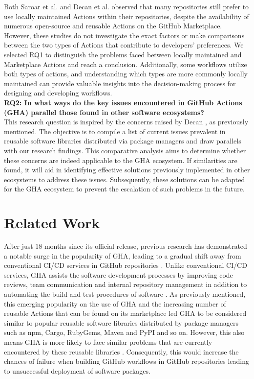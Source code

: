 \documentclass[conference]{IEEEtran}
\begin{document}
    Both Saroar et al. \cite{saroar2023developers} and Decan et al. \cite{decan2022use} observed that many repositories still prefer to use locally maintained Actions within their repositories, despite the availability of numerous open-source and reusable Actions on the GitHub Marketplace. However, these studies do not investigate the exact factors or make comparisons between the two types of Actions that contribute to developers' preferences. We selected RQ1 to distinguish the problems faced between locally maintained and Marketplace Actions and reach a conclusion. Additionally, some workflows utilize both types of actions, and understanding which types are more commonly locally maintained can provide valuable insights into the decision-making process for designing and developing workflows. \\

 \textbf{RQ2: In what ways do the key issues encountered in GitHub Actions (GHA) parallel those found in other software ecosystems?}\\

    This research question is inspired by the concerns raised by Decan \cite{decan2022use}, as previously mentioned. The objective is to compile a list of current issues prevalent in reusable software libraries distributed via package managers and draw parallels with our research findings. This comparative analysis aims to determine whether these concerns are indeed applicable to the GHA ecosystem. If similarities are found, it will aid in identifying effective solutions previously implemented in other ecosystems to address these issues. Subsequently, these solutions can be adapted for the GHA ecosystem to prevent the escalation of such problems in the future.




\section{Related Work}
    After just 18 months since its official release, previous research has demonstrated a notable surge in the popularity of GHA, leading to a gradual shift away from conventional CI/CD services in GitHub repositories \cite{golzadeh2021rise}. Unlike conventional CI/CD services, GHA assists the software development processes by improving code reviews, team communication and internal repository management in addition to automating the build and test procedures of software \cite{chandrasekara2021hands}. As previously mentioned, this emerging popularity on the use of GHA and the increasing number of reusable Actions that can be found on its marketplace led GHA to be considered similar to popular reusable software libraries distributed by package managers such as npm, Cargo, RubyGems, Maven and PyPI and so on. However, this also means GHA is more likely to face similar problems that are currently encountered by these reusable libraries \cite{decan2022use}. Consequently, this would increase the chances of failure when building GitHub workflows in GitHub repositories leading to unsuccessful deployment of software packages. \\
\end{document}
